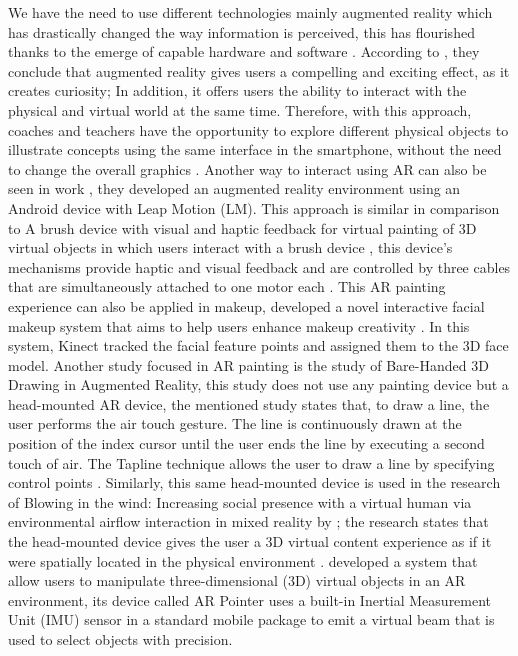 \documentclass[twocolumn]{article}
\begin{document}
We have the need to use different technologies mainly augmented   reality which has 
drastically changed the way information is perceived, this has flourished thanks to the emerge 
of capable hardware and software \cite{UtilizingA}. According to \citeauthor{Anovelinte}, they 
conclude that augmented reality gives users a compelling and exciting effect, as it creates 
curiosity; In addition, it offers users the ability to interact with the physical and virtual
world at the same time. Therefore, with this approach, coaches and teachers have the 
opportunity to explore different physical objects to illustrate concepts using the same 
interface in the smartphone, without the need to change the overall graphics 
\cite{Anovelinte}. Another way to interact using AR can also be seen in \textcite{LeapMotion}
work , they developed an augmented reality environment using an Android device with Leap 
Motion (LM). This approach is similar in comparison to A brush device with visual and haptic 
feedback for virtual painting of 3D virtual objects in which users interact with a brush 
device \citeauthor{Abrushdevi}, this device’s mechanisms provide haptic and visual feedback 
and are controlled by three cables that are simultaneously attached to one motor each 
\cite{Abrushdevi}. This AR painting experience can also be applied in makeup, 
\citeauthor{MakeupCrea} developed a novel interactive facial makeup system that aims to help 
users enhance makeup creativity \cite{MakeupCrea}. In this system, Kinect tracked the facial 
feature points and assigned them to the 3D face model. Another study focused in AR painting 
is the study of \citeauthor{Bare-Hande} Bare-Handed 3D Drawing in Augmented Reality, this study 
does not use any painting device but a head-mounted AR device, the mentioned study states 
that, to draw a line, the user performs the air touch gesture. The line is continuously drawn
at the position of the index cursor until the user ends the line by executing a second touch 
of air. The Tapline technique allows the user to draw a line by specifying control points 
\cite{Bare-Hande}. Similarly, this same head-mounted device is used in the research of Blowing 
in the wind: Increasing social presence with a virtual human via environmental airflow 
interaction in mixed reality by \citeauthor{Blowingint}; the research states that the 
head-mounted device gives the user a 3D virtual content experience as if it were spatially 
located in the physical environment \cite{Blowingint}.\citeauthor{ARPointer:} developed a system
that allow users to manipulate three-dimensional (3D) virtual objects in an AR environment, its 
device called AR Pointer uses a built-in Inertial Measurement Unit (IMU) sensor in a standard mobile
package to emit a virtual beam that is used to select objects with precision.\cite{ARPointer:}
\bigskip
\end{document}
